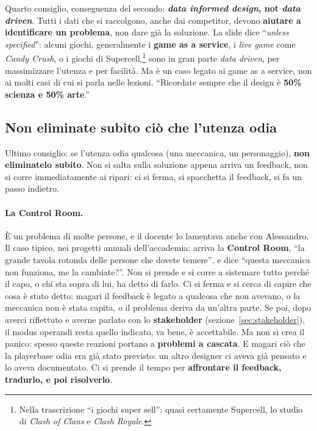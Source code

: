 Quarto consiglio, conseguenza del secondo: \textbf{\emph{data informed
design}, not \emph{data driven}}. Tutti i dati che si raccolgono, anche dai
competitor, devono \textbf{aiutare a identificare un problema}, non dare già
la soluzione. La slide dice ``\emph{unless specified}'': alcuni giochi,
generalmente i \textbf{game as a service}, i \emph{live game} come
\emph{Candy Crush}, o i giochi di Supercell,\footnote{Nella trascrizione ``i
giochi super sell''; quasi certamente Supercell, lo studio di \emph{Clash of
Clans} e \emph{Clash Royale}.} sono in gran parte \emph{data driven}, per
massimizzare l'utenza e per facilità. Ma è un caso legato ai game as a
service, non ai molti casi di cui si parla nelle lezioni. ``Ricordate sempre
che il design è \textbf{50\% scienza e 50\% arte}.''

\subsection{Non eliminate subito ciò che l'utenza odia}

Ultimo consiglio: se l'utenza odia qualcosa (una meccanica, un personaggio),
\textbf{non eliminatelo subito}. Non si salta sulla soluzione appena arriva
un feedback, non si corre immediatamente ai ripari: ci si ferma, si
spacchetta il feedback, si fa un passo indietro.

\paragraph{La Control Room.} È un problema di molte persone, e il docente lo
lamentava anche con Alessandro. Il caso tipico, nei progetti annuali
dell'accademia: arriva la \textbf{Control Room}, ``la grande tavola rotonda
delle persone che dovete temere'', e dice ``questa meccanica non funziona,
me la cambiate?''. Non si prende e si corre a sistemare tutto perché il capo,
o chi sta sopra di lui, ha detto di farlo. Ci si ferma e si cerca di capire
che cosa è stato detto: magari il feedback è legato a qualcosa che non
avevano, o la meccanica non è stata capita, o il problema deriva da
un'altra parte. Se poi, dopo averci riflettuto e averne parlato con lo
\textbf{stakeholder} (sezione~\ref{sec:stakeholder}), il modus operandi resta
quello indicato, va bene, è accettabile. Ma non si crea il panico: spesso
queste reazioni portano a \textbf{problemi a cascata}. E magari ciò che la
playerbase odia era già stato previsto: un altro designer ci aveva già
pensato e lo aveva documentato. Ci si prende il tempo per
\textbf{affrontare il feedback, tradurlo, e poi risolverlo}.

